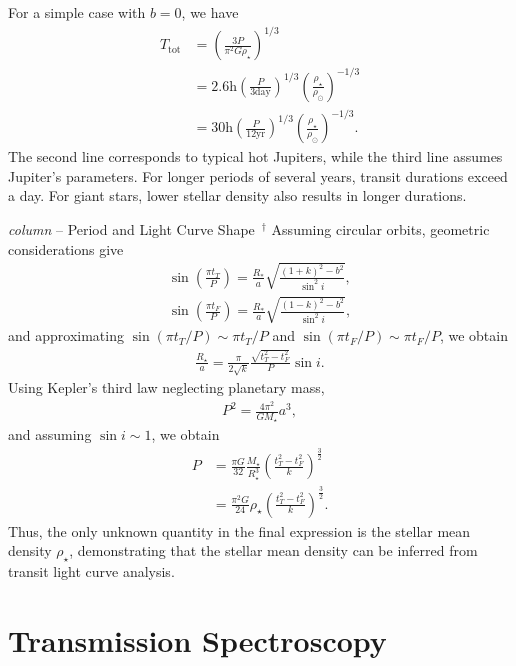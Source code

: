 For a simple case with $b=0$, we have
\begin{align}
T_\mathrm{tot}  &= \left( \frac{3  P}{\pi^2 G \rho_\star} \right)^{1/3} \\
 &= 2.6 \mathrm{h} \left(\frac{P}{3 \mathrm{day}}\right)^{1/3} \left(\frac{\rho_\star}{\rho_\odot}\right)^{-1/3} \\
 &= 30  \mathrm{h} \left(\frac{P}{12 \mathrm{yr}}\right)^{1/3} \left(\frac{\rho_\star}{\rho_\odot}\right)^{-1/3}.
\end{align}
The second line corresponds to typical hot Jupiters, while the third line assumes Jupiter’s parameters. For longer periods of several years, transit durations exceed a day. For giant stars, lower stellar density also results in longer durations.  

\begin{itembox}{{\it column} -- Period and Light Curve Shape $\,^\dagger$}
\footnotesize
Assuming circular orbits, geometric considerations give
\begin{align}
\label{eq:totald}
\sin{ \left( \frac{\pi t_T}{P} \right)}  = \frac{R_*}{a} \sqrt{\frac{(1+k)^2 - b^2}{\sin^2{i}}}, \\
\label{eq:totalf}
\sin{ \left( \frac{\pi t_F}{P} \right)}  = \frac{R_*}{a} \sqrt{\frac{(1-k)^2 - b^2}{\sin^2{i}}},
\end{align}
and approximating $\sin{(\pi t_T/P)} \sim \pi t_T/P$ and $\sin{(\pi t_F/P)} \sim \pi t_F/P$, we obtain
\begin{align}
\label{eq:ra}
\frac{R_\star}{a} = \frac{\pi}{2 \sqrt{k}} \frac{\sqrt{t_T^2 - t_F^2}}{P} \sin{i}.
\end{align}
Using Kepler’s third law neglecting planetary mass,
\begin{align}
P^2 = \frac{4 \pi^2}{G M_\star} a^3,
\end{align}
and assuming $\sin{i} \sim 1$, we obtain
\begin{align}
\label{eq:pk}
P &= \frac{\pi G}{32} \frac{M_\star}{R_\star^3} \left( \frac{t_T^2 -t_F^2}{k} \right)^{\frac{3}{2}} \\
  &= \frac{\pi^2 G}{24} \rho_\star \left( \frac{t_T^2 -t_F^2}{k} \right)^{\frac{3}{2}}.
\end{align}
Thus, the only unknown quantity in the final expression is the stellar mean density $\rho_\star$, demonstrating that the stellar mean density can be inferred from transit light curve analysis.
\end{itembox}

\section{Transmission Spectroscopy}

